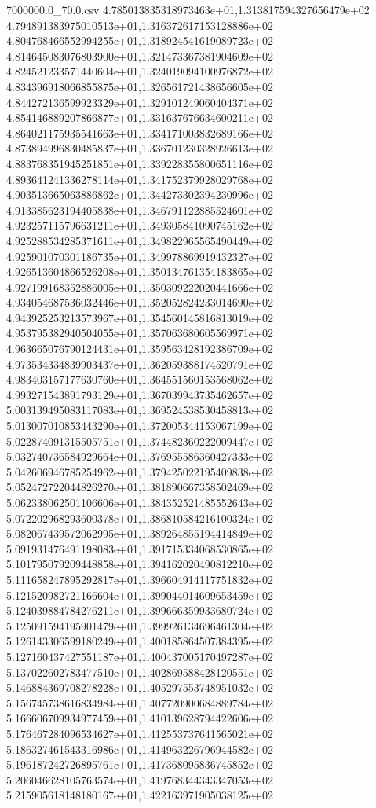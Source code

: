 \begin{filecontents*}{7000000.0_70.0.csv}
4.785013835318973463e+01,1.313817594327656479e+02
4.794891383975010513e+01,1.316372617153128886e+02
4.804768466552994255e+01,1.318924541619089723e+02
4.814645083076803900e+01,1.321473367381904609e+02
4.824521233571440604e+01,1.324019094100976872e+02
4.834396918066855875e+01,1.326561721438656605e+02
4.844272136599923329e+01,1.329101249060404371e+02
4.854146889207866877e+01,1.331637676634600211e+02
4.864021175935541663e+01,1.334171003832689166e+02
4.873894996830485837e+01,1.336701230328926613e+02
4.883768351945251851e+01,1.339228355800651116e+02
4.893641241336278114e+01,1.341752379928029768e+02
4.903513665063886862e+01,1.344273302394230996e+02
4.913385623194405838e+01,1.346791122885524601e+02
4.923257115796631211e+01,1.349305841090745162e+02
4.925288534285371611e+01,1.349822965565490449e+02
4.925901070301186735e+01,1.349978869919432327e+02
4.926513604866526208e+01,1.350134761354183865e+02
4.927199168352886005e+01,1.350309222020441666e+02
4.934054687536032446e+01,1.352052824233014690e+02
4.943925253213573967e+01,1.354560145816813019e+02
4.953795382940504055e+01,1.357063680605569971e+02
4.963665076790124431e+01,1.359563428192386709e+02
4.973534334839903437e+01,1.362059388174520791e+02
4.983403157177630760e+01,1.364551560153568062e+02
4.993271543891793129e+01,1.367039943735462657e+02
5.003139495083117083e+01,1.369524538530458813e+02
5.013007010853443290e+01,1.372005344153067199e+02
5.022874091315505751e+01,1.374482360222009447e+02
5.032740736584929664e+01,1.376955586360427333e+02
5.042606946785254962e+01,1.379425022195409838e+02
5.052472722044826270e+01,1.381890667358502469e+02
5.062338062501106606e+01,1.384352521485552643e+02
5.072202968293600378e+01,1.386810584216100324e+02
5.082067439572062995e+01,1.389264855194414849e+02
5.091931476491198083e+01,1.391715334068530865e+02
5.101795079209448858e+01,1.394162020490812210e+02
5.111658247895292817e+01,1.396604914117751832e+02
5.121520982721166604e+01,1.399044014609653459e+02
5.124039884784276211e+01,1.399666359933680724e+02
5.125091594195901479e+01,1.399926134696461304e+02
5.126143306599180249e+01,1.400185864507384395e+02
5.127160437427551187e+01,1.400437005170497287e+02
5.137022602783477510e+01,1.402869588428120551e+02
5.146884369708278228e+01,1.405297553748951032e+02
5.156745738616834984e+01,1.407720900684889784e+02
5.166606709934977459e+01,1.410139628794422606e+02
5.176467284096534627e+01,1.412553737641565021e+02
5.186327461543316986e+01,1.414963226796944582e+02
5.196187242726895761e+01,1.417368095836745852e+02
5.206046628105763574e+01,1.419768344343347053e+02
5.215905618148180167e+01,1.422163971905038125e+02

\end{filecontents*}
